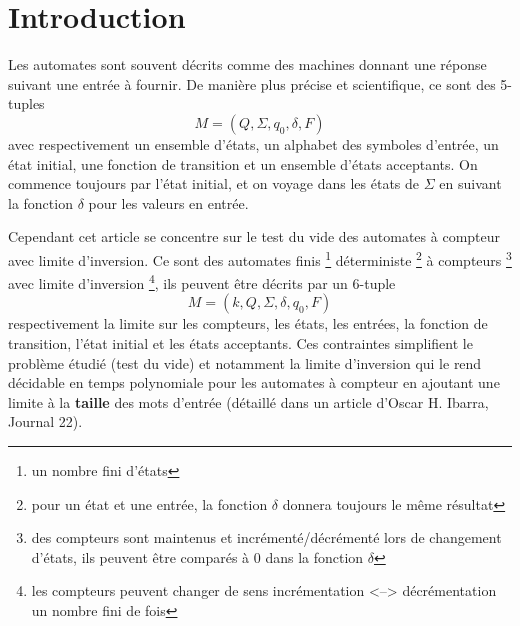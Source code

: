\section{Introduction}
Les automates sont souvent décrits comme des machines donnant une réponse suivant une entrée à fournir. De manière plus précise et scientifique, ce sont des 5-tuples 
\[ M = (Q,\Sigma ,q_{0},\delta ,F) \]
avec respectivement un ensemble d'états, un alphabet des symboles d'entrée, un état initial, une fonction de transition et un ensemble d'états acceptants. On commence toujours par l'état initial, et on voyage dans les états de $\Sigma$ en suivant la fonction $\delta$ pour les valeurs en entrée.\par
Cependant cet article se concentre sur le test du vide des automates à compteur avec limite d'inversion. Ce sont des automates finis \footnote{un nombre fini d'états} déterministe \footnote{pour un état et une entrée, la fonction $\delta$ donnera toujours le même résultat} à compteurs \footnote{des compteurs sont maintenus et incrémenté/décrémenté lors de changement d'états, ils peuvent être comparés à 0 dans la fonction $\delta$} avec limite d'inversion \footnote{les compteurs peuvent changer de sens incrémentation <--> décrémentation un nombre fini de fois}, ils peuvent être décrits par un 6-tuple 
\[ M = (k, Q, \Sigma, \delta, q_{0}, F) \]
respectivement la limite sur les compteurs, les états, les entrées, la fonction de transition, l'état initial et les états acceptants. Ces contraintes simplifient le problème étudié (test du vide) et notamment la limite d'inversion qui le rend décidable en temps polynomiale pour les automates à compteur en ajoutant une limite à la {\bf taille} des mots d'entrée (détaillé dans un article d'Oscar H. Ibarra, Journal 22). 